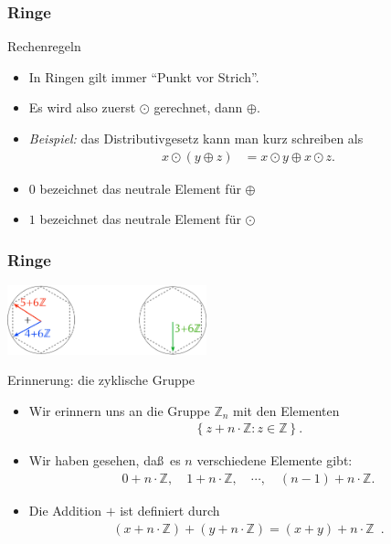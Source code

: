 \documentclass{beamer}
\renewcommand{\emph}[1]{{\textcolor{solarizedRed}{\itshape #1}}}
\newcommand\ZZ{\mathbb Z}
\newcommand\cbc[1]{\left\{{#1}\right\}}
\newcommand{\ue}{\"u}
\renewcommand{\otimes}{\odot}
\begin{document}
\begin{frame}\frametitle{Ringe}
	\begin{block}{Rechenregeln}
		\begin{itemize}
			\item In Ringen gilt immer ``Punkt vor Strich''.
			\item Es wird also zuerst $\otimes$ gerechnet, dann $\oplus$.
			\item \emph{Beispiel:} das Distributivgesetz kann man kurz schreiben als
			\begin{align*}
				x\otimes(y\oplus z)&=x\otimes y\oplus x\otimes z.
			\end{align*}
		\item $0$ bezeichnet das neutrale Element f\ue r $\oplus$
		\item $1$ bezeichnet das neutrale Element f\ue r $\otimes$
		\end{itemize}
	\end{block}
\end{frame}

\begin{frame}\frametitle{Ringe}
	\hfill\includegraphics[height=20mm]{pics/cyclicGroup2.pdf}
	\begin{block}{Erinnerung: die zyklische Gruppe}
		\begin{itemize}
		\item Wir erinnern uns an die Gruppe $\ZZ_n$ mit den Elementen
			\begin{align*}
				\cbc{z+n\cdot\ZZ:z\in\ZZ}.
			\end{align*}
		\item Wir haben gesehen, da\ss\ es $n$ verschiedene Elemente gibt:
			\begin{align*}
				0+n\cdot\ZZ,\quad1+n\cdot\ZZ,\quad\cdots,\quad(n-1)+n\cdot\ZZ.
			\end{align*}
		\item Die Addition $+$ ist definiert durch
			\begin{align*}
				(x+n\cdot\ZZ)+(y+n\cdot\ZZ)=(x+y)+n\cdot\ZZ\enspace.
			\end{align*}
		\end{itemize}
	\end{block}
\end{frame}
\end{document}
